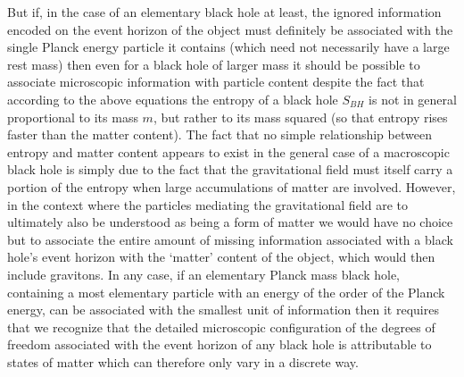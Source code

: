 \documentclass[notitlepage,12pt]{report}
\begin{document}
But if, in the case of an elementary black hole at least, the ignored information encoded on the event horizon of the object must definitely be associated with the single Planck energy particle it contains (which need not necessarily have a large rest mass) then even for a black hole of larger mass it should be possible to associate microscopic information with particle content despite the fact that according to the above equations the entropy of a black hole $S_{BH}$ is not in general proportional to its mass $m$, but rather to its mass squared (so that entropy rises faster than the matter content). The fact that no simple relationship between entropy and matter content appears to exist in the general case of a macroscopic black hole is simply due to the fact that the gravitational field must itself carry a portion of the entropy when large accumulations of matter are involved. However, in the context where the particles mediating the gravitational field are to ultimately also be understood as being a form of matter we would have no choice but to associate the entire amount of missing information associated with a black hole's event horizon with the `matter' content of the object, which would then include gravitons. In any case, if an elementary Planck mass black hole, containing a most elementary particle with an energy of the order of the Planck energy, can be associated with the smallest unit of information then it requires that we recognize that the detailed microscopic configuration of the degrees of freedom associated with the event horizon of any black hole is attributable to states of matter which can therefore only vary in a discrete way.
\end{document}

